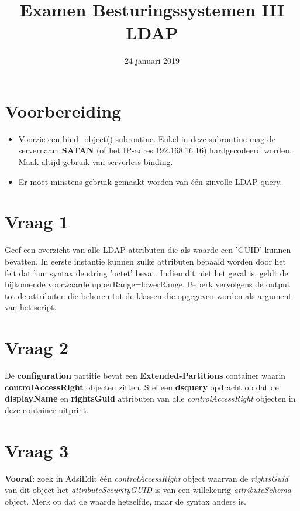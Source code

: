 \documentclass{article}
\begin{document}
\title{Examen Besturingssystemen III LDAP}
\date{24 januari 2019}
\author{}
\maketitle

\section*{Voorbereiding}
\begin{itemize}
	\item Voorzie een bind\_object() subroutine. Enkel in deze subroutine mag de servernaam \textbf{SATAN} (of het IP-adres 192.168.16.16) hardgecodeerd worden. Maak altijd gebruik van serverless binding.
	
	\item Er moet minstens gebruik gemaakt worden van één zinvolle LDAP query.
\end{itemize}

\section*{Vraag 1} 
Geef een overzicht van alle LDAP-attributen die als waarde een 'GUID' kunnen bevatten. In eerste instantie kunnen zulke attributen bepaald worden door het feit dat hun syntax de string 'octet' bevat. Indien dit niet het geval is, geldt de bijkomende voorwaarde upperRange=lowerRange. Beperk vervolgens de output tot de attributen die behoren tot de klassen die opgegeven worden als argument van het script.

\section*{Vraag 2}
De \textbf{configuration} partitie bevat een \textbf{Extended-Partitions} container waarin \textbf{controlAccessRight} objecten zitten. Stel een \textbf{dsquery} opdracht op dat de \textbf{displayName} en \textbf{rightsGuid} attributen van alle \textit{controlAccessRight} objecten in deze container uitprint.

\section*{Vraag 3}
\textbf{Vooraf:} zoek in AdsiEdit één \textit{controlAccessRight} object waarvan de \textit{rightsGuid} van dit object het \textit{attributeSecurityGUID} is van een willekeurig \textit{attributeSchema} object. Merk op dat de waarde hetzelfde, maar de syntax anders is.
\end{document}
